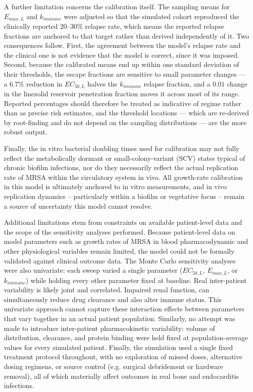 \documentclass[12pt, draftcls, onecolumn]{IEEEtran}
\begin{document}
A further limitation concerns the calibration itself. The sampling means for
$E_{max,L}$ and $k_{immune}$ were adjusted so that the simulated cohort
reproduced the clinically reported $20$--$30\%$ relapse rate, which means the
reported relapse fractions are anchored to that target rather than derived
independently of it. Two consequences follow. First, the agreement between the
model's relapse rate and the clinical one is not evidence that the model is
correct, since it was imposed. Second, because the calibrated means end up
within one standard deviation of their thresholds, the escape fractions are
sensitive to small parameter changes --- a $6.7\%$ reduction in $EC_{50,L}$
halves the $k_{immune}$ relapse fraction, and a $0.01$ change in the linezolid
reservoir penetration fraction moves it across most of its range. Reported
percentages should therefore be treated as indicative of regime rather than as
precise risk estimates, and the threshold locations --- which are re-derived by
root-finding and do not depend on the sampling distributions --- are the more
robust output.

Finally, the in vitro bacterial doubling times used for calibration may
not fully reflect the metabolically dormant or small-colony-variant (SCV)
states typical of chronic biofilm infections, nor do they
necessarily reflect the actual replication rate of MRSA within the
circulatory system in vivo. All growth-rate calibration in this model is
ultimately anchored to in vitro measurements, and in vivo replication
dynamics -- particularly within a biofilm or vegetative focus -- remain a
source of uncertainty this model cannot resolve.

Additional limitations stem from constraints on available patient-level
data and the scope of the sensitivity analyses performed. Because
patient-level data on model parameters such as growth rates of
MRSA in blood pharmacodynamic and other physiological variables remain limited, the
model could not be formally validated against clinical outcome data. The
Monte Carlo sensitivity analyses were also univariate: each sweep varied
a single parameter ($EC_{50,L}$, $E_{max,L}$, or $k_{immune}$) while
holding every other parameter fixed at baseline. Real
inter-patient variability is likely joint and correlated.  Impaired renal function, can simultaneously reduce drug clearance and also alter immune status.  This univariate approach cannot capture
these interaction effects between parameters that vary together in an actual
patient population. Similarly, no attempt was made to introduce
inter-patient pharmacokinetic variability: volume of distribution,
clearance, and protein binding were held fixed at population-average
values for every simulated patient. Finally, the simulation
used a single fixed treatment protocol throughout, with no exploration
of missed doses, alternative dosing regimens, or source control (e.g. 
surgical debridement or hardware removal), all of which materially
affect outcomes in real bone and endocarditis infections.





\end{document}
